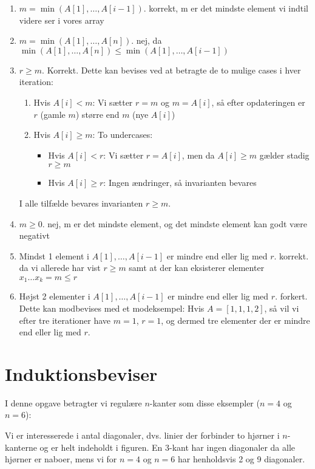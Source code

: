 \documentclass{article}
\theoremstyle{definition}
\begin{document}
\begin{enumerate}
    \item $m = \min(A[1],\ldots,A[i-1])$. korrekt, m er det mindste element vi indtil videre ser i vores array
    \item $m = \min(A[1],\ldots,A[n])$. nej, da $\min(A[1],\ldots,A[n]) \leq \min(A[1],\ldots,A[i-1])$
    \item $r \geq m$. Korrekt. Dette kan bevises ved at betragte de to mulige cases i hver iteration:
    \begin{enumerate}
        \item Hvis $A[i] < m$: Vi sætter $r = m$ og $m = A[i]$, så efter opdateringen er $r$ (gamle $m$) større end $m$ (nye $A[i]$)
        \item Hvis $A[i] \geq m$: To undercases:
            \begin{itemize}
                \item Hvis $A[i] < r$: Vi sætter $r = A[i]$, men da $A[i] \geq m$ gælder stadig $r \geq m$
                \item Hvis $A[i] \geq r$: Ingen ændringer, så invarianten bevares
            \end{itemize}
    \end{enumerate}

    I alle tilfælde bevares invarianten $r \geq m$.
    \item $m \geq 0$. nej, m er det mindste element, og det mindste element kan godt være negativt
    \item Mindst 1 element i $A[1],\ldots,A[i-1]$ er mindre end eller lig med $r$. korrekt. da vi allerede har vist $r \geq m$ samt at der kan eksisterer elementer $x_1 \dots x_k = m \leq r$
    \item Højst 2 elementer i $A[1],\ldots,A[i-1]$ er mindre end eller lig med $r$. forkert.
    Dette kan modbevises med et modeksempel: Hvis $A = [1,1,1,2]$, så vil vi efter tre iterationer have $m=1$, $r=1$, 
    og dermed tre elementer der er mindre end eller lig med $r$.
\end{enumerate}

\section{Induktionsbeviser}
I denne opgave betragter vi regulære $n$-kanter som disse eksempler ($n = 4$ og $n = 6$):

Vi er interesserede i antal diagonaler, dvs. linier der forbinder to hjørner i $n$-kanterne og er helt indeholdt i figuren. En 3-kant har ingen diagonaler da alle hjørner er naboer, mens vi for $n = 4$ og $n = 6$ har henholdsvis 2 og 9 diagonaler.
\end{document}
